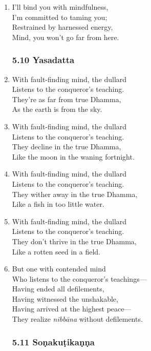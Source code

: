 \documentclass[10pt, openany]{book}
\begin{document}
\begin{enumerate}
\item I’ll bind you with mindfulness,\\
I’m committed to taming you;\\
Restrained by harnessed energy,\\
Mind, you won’t go far from here.

\subsubsection*{5.10 Yasadatta}

\item With fault-finding mind, the dullard\\
Listens to the conqueror’s teaching.\\
They’re as far from true Dhamma,\\
As the earth is from the sky.

\item With fault-finding mind, the dullard\\
Listens to the conqueror’s teaching.\\
They decline in the true Dhamma,\\
Like the moon in the waning fortnight.

\item With fault-finding mind, the dullard\\
Listens to the conqueror’s teaching.\\
They wither away in the true Dhamma,\\
Like a fish in too little water.

\item With fault-finding mind, the dullard\\
Listens to the conqueror’s teaching.\\
They don’t thrive in the true Dhamma,\\
Like a rotten seed in a field.

\item But one with contended mind\\
Who listens to the conqueror’s teachings—\\
Having ended all defilements,\\
Having witnessed the unshakable,\\
Having arrived at the highest peace—\\
They realize \emph{nibbāna} without defilements.

\subsubsection*{5.11 Soṇakuṭikaṇṇa}


\end{enumerate}
\end{document}
